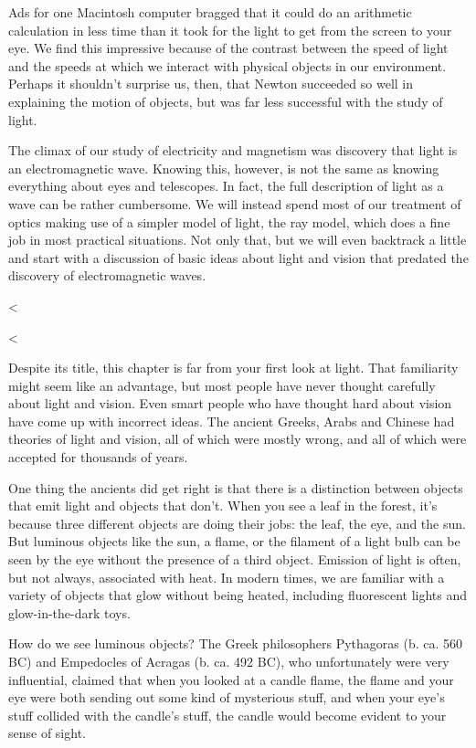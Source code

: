 Ads for one Macintosh computer bragged that it could do an
arithmetic calculation in less time than it took for the
light to get from the screen to your eye. We find this
impressive because of the contrast between the speed of
light and the speeds at which we interact with physical
objects in our environment. Perhaps it shouldn't surprise
us, then, that Newton succeeded so well in explaining the
motion of objects, but was far less successful with the study of light.

The climax of our study of
electricity and magnetism was discovery that light is an
electromagnetic wave. Knowing this, however, is not the same
as knowing everything about eyes and telescopes. In fact,
the full description of light as a wave can be rather
cumbersome. We will instead spend most of our treatment of optics making
use of a simpler model of light, the ray model, which does a
fine job in most practical situations. Not only that, but we
will even backtrack a little and start with a discussion of
basic ideas about light and vision that predated the
discovery of electromagnetic waves.

<%

<%

Despite its title, this chapter is far from your first look
at light. That familiarity might seem like an advantage, but
most people have never thought carefully about light and
vision. Even smart people who have thought hard about vision
have come up with incorrect ideas. The ancient Greeks, Arabs
and Chinese had theories of light and vision,
all of which were mostly wrong, and all of which were
accepted for thousands of years.

One thing the ancients did get right is that there is a
distinction between objects that emit light and objects that
don't. When you see a leaf in the forest, it's because three
different objects are doing their jobs: the leaf, the eye,
and the sun. But luminous objects like the sun, a flame, or
the filament of a light bulb can be seen by the eye without
the presence of a third object. Emission of light is often,
but not always, associated with heat. In modern times, we
are familiar with a variety of objects that glow without
being heated, including fluorescent lights and glow-in-the-dark toys.

How do we see luminous objects? The Greek philosophers
Pythagoras (b. ca. 560 BC) and Empedocles of Acragas (b. ca. 492 BC), who
unfortunately were very influential, claimed that when you
looked at a candle flame, the flame and your eye were both
sending out some kind of mysterious stuff, and when your
eye's stuff collided with the candle's stuff, the candle
would become evident to your sense of sight.


